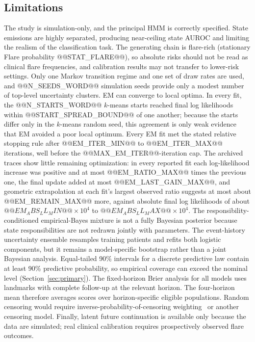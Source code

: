 \documentclass{ieeeaccess}
\begin{document}
\subsection{Limitations}\label{sec:limitations}
The study is simulation-only, and the principal HMM is correctly specified. State emissions are highly separated, producing near-ceiling state AUROC and limiting the realism of the classification task. The generating chain is flare-rich (stationary Flare probability @@STAT_FLARE@@), so absolute risks should not be read as clinical flare frequencies, and calibration results may not transfer to lower-risk settings. Only one Markov transition regime and one set of draw rates are used, and @@N_SEEDS_WORD@@ simulation seeds provide only a modest number of top-level uncertainty clusters. EM can converge to local optima. In every fit, the @@N_STARTS_WORD@@ $k$\nobreakdash-means starts reached final log likelihoods within @@START_SPREAD_BOUND@@ of one another; because the starts differ only in the $k$\nobreakdash-means random seed, this agreement is only weak evidence that EM avoided a poor local optimum. Every EM fit met the stated relative stopping rule after @@EM_ITER_MIN@@ to @@EM_ITER_MAX@@ iterations, well before the @@MAX_EM_ITER@@-iteration cap. The archived traces show little remaining optimization: in every reported fit each log-likelihood increase was positive and at most @@EM_RATIO_MAX@@ times the previous one, the final update added at most @@EM_LAST_GAIN_MAX@@, and geometric extrapolation at each fit's largest observed ratio suggests at most about @@EM_REMAIN_MAX@@ more, against absolute final log likelihoods of about $@@EM_ABS_LL_MIN@@\times 10^{4}$ to $@@EM_ABS_LL_MAX@@\times 10^{4}$. The responsibility-conditioned empirical-Bayes mixture is not a fully Bayesian posterior because state responsibilities are not redrawn jointly with parameters. The event-history uncertainty ensemble resamples training patients and refits both logistic components, but it remains a model-specific bootstrap rather than a joint Bayesian analysis. Equal-tailed 90\% intervals for a discrete predictive law contain at least 90\% predictive probability, so empirical coverage can exceed the nominal level (Section~\ref{sec:primary}). The fixed-horizon Brier analysis for all models uses landmarks with complete follow-up at the relevant horizon. The four-horizon mean therefore averages scores over horizon-specific eligible populations. Random censoring would require inverse-probability-of-censoring weighting~\cite{graf1999} or another censoring model. Finally, latent future continuation is available only because the data are simulated; real clinical calibration requires prospectively observed flare outcomes.
\end{document}
